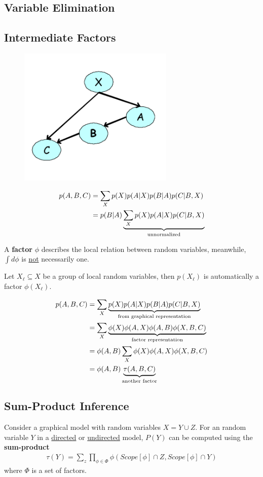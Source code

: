 \documentclass{article}
\begin{document}
	\subsection{Variable Elimination}
	
	\subsection{Intermediate Factors}
	\begin{figure}[H]
		\centering
		\includegraphics[width=0.3\linewidth]{figures/week_4_2.png}
	\end{figure}
	\begin{align}
		p(A, B, C) &=\sum_{X} p(X) p(A | X) p(B | A) p(C | B, X) \\
		&=p(B | A) \underbrace{\sum_{X} p(X) p(A | X) p(C | B, X)}_{\text{{unnormalized}}}
	\end{align}
	\begin{definition}
		A \textbf{factor} $\phi$ describes the local relation between random variables, meanwhile, $\int d\phi$ is \ul{not} necessarily one.
	\end{definition}

	\begin{remark}
		Let $X_\ell \subseteq X$ be a group of local random variables, then $p(X_\ell)$ is automatically a factor $\phi(X_\ell)$.
	\end{remark}

	\begin{align}
		p(A, B, C) &=\sum_{X} \underbrace{p(X) p(A | X) p(B | A) p(C | B, X)}_{\text{{from graphical representation}}} \\
		&=\sum_{X} \underbrace{\phi(X) \phi(A, X) \phi(A, B) \phi(X, B, C)}_{\text{{factor representation}}} \\
		&=\phi(A, B) \sum_{X} \phi(X) \phi(A, X) \phi(X, B, C) \\
		&=\phi(A, B) \underbrace{\tau(A, B, C)}_{\text{{another factor}}}
	\end{align}
	
	\subsection{Sum-Product Inference}
	\begin{theorem}
		Consider a graphical model with random variables $X = Y \cup Z$.
		For an random variable $Y$ in a \ul{directed} or \ul{undirected} model, $P(Y)$ can be computed using the \textbf{sum-product}
		\begin{align}
			\tau(Y) = \sum_z \prod_{\phi \in \Phi} \phi({Scope[\phi]\cap Z}, {Scope[\phi] \cap Y})
		\end{align}
		where $\Phi$ is a set of factors.
	\end{theorem}
	
\end{document}
